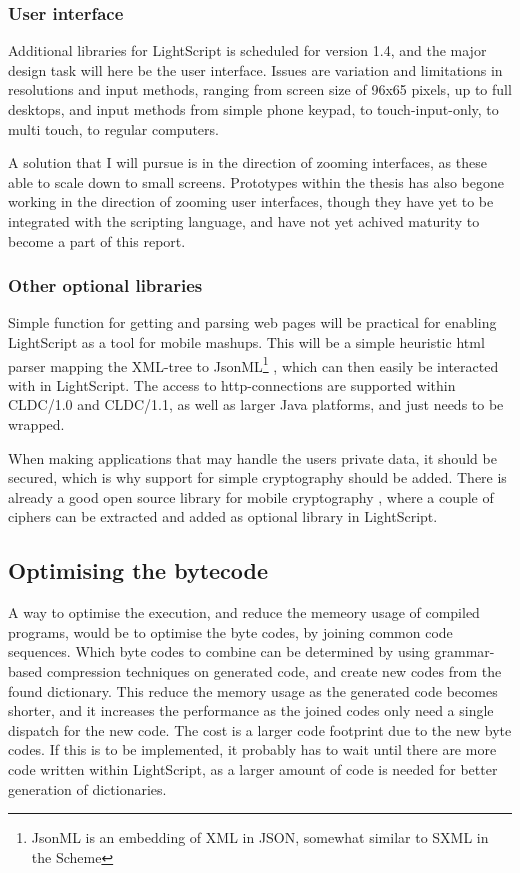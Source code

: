 \documentclass[11pt]{report}
\begin{document}
\subsubsection{User interface}
Additional libraries for LightScript is scheduled for version 1.4, and the major design task will here be the user interface. 
Issues are variation and limitations in resolutions and input methods, ranging from screen size of 96x65 pixels, up to full desktops, and input methods from simple phone keypad, to touch-input-only, to multi touch, to regular computers.

A solution that I will pursue is in the direction of zooming interfaces, as these able to scale down to small screens.
Prototypes within the thesis has also begone working in the direction of zooming user interfaces, though they have yet to be integrated with the scripting language, and have not yet achived maturity to become a part of this report.

\subsubsection{Other optional libraries}

Simple function for getting and parsing web pages will be practical for enabling LightScript as a tool for mobile mashups. This will be a simple heuristic html parser mapping the XML-tree to JsonML\footnote{JsonML is an embedding of XML in JSON, somewhat similar to SXML in the Scheme} \cite{jsonml}, which can then easily be interacted with in LightScript.
The access to http-connections are supported within CLDC/1.0 and CLDC/1.1, as well as larger Java platforms, and just needs to be wrapped.

When making applications that may handle the users private data, it should be secured, which is why support for simple cryptography should be added. There is already a good open source library for mobile cryptography \cite{bouncycastle}, where a couple of ciphers can be extracted and added as optional library in LightScript.

\subsection{Optimising the bytecode}

A way to optimise the execution, and reduce the memeory usage of compiled programs, would be to optimise the byte codes, by joining common code sequences. Which byte codes to combine can be determined by using grammar-based compression techniques on generated code, and create new codes from the found dictionary. 
This reduce the memory usage as the generated code becomes shorter, and it increases the performance as the joined codes only need a single dispatch for the new code. The cost is a larger code footprint due to the new byte codes. If this is to be implemented, it probably has to wait until there are more code written within LightScript, as a larger amount of code is needed for better generation of dictionaries.
\end{document}
